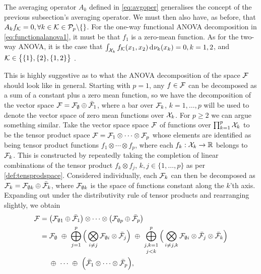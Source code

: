 The averaging operator $A_k$ defined in \cref{eq:avgoper} generalises the concept of the previous subsection's averaging operator.
We must then also have, as before, that $A_kf_{\mathcal K} = 0, \forall k \in {\mathcal K} \in {\mathcal P}_p\backslash\{\}$.
For the one-way functional ANOVA decomposition in \cref{eq:functionalanova1}, it must be that $f_1$ is a zero-mean function.
As for the two-way ANOVA, it is the case that $\int_{{\mathcal X}_k} f_{\mathcal K}(x_1,x_2) \operatorname{d}\hspace{0.5pt}\!\nu_k(x_k) = 0, k=1,2$, and ${\mathcal K} \in \big\{ \{1\}, \{2\}, \{1,2\} \big\}$ \citep{durrande2013anova}.

This is highly suggestive as to what the ANOVA decomposition of the space ${\mathcal F}$ should look like in general.
Starting with $p=1$, any $f \in {\mathcal F}$ can be decomposed as a sum of a constant plus a zero mean function, so we have the
decomposition of the vector space ${\mathcal F} = {\mathcal F}_\emptyset \oplus \bar{{\mathcal F}}_1$, where 
a bar over ${\mathcal F}_k$, $k=1,\dots,p$ will be used to denote the vector space of zero mean functions over ${\mathcal X}_k$.
For $p\geq 2$ we can argue something similar.
Take the vector space space ${\mathcal F}$ of functions over $\prod_{k=1}^p {\mathcal X}_k$ to be the tensor product space ${\mathcal F} = {\mathcal F}_1 \otimes \cdots \otimes {\mathcal F}_p$ whose elements are identified as being tensor product functions $f_1 \otimes\cdots\otimes f_p$, where each $f_k:{\mathcal X}_k\to\mathbb{R}$ belongs to ${\mathcal F}_k$.
This is constructed by repeatedly taking the completion of linear combinations of the tensor product $f_k \otimes f_j$, $k,j\in\{1,\dots,p\}$ as per \cref{def:tensprodspace}.
Considered individually, each ${\mathcal F}_k$ can then be decomposed as ${\mathcal F}_k = {\mathcal F}_{\emptyset k} \oplus \bar{{\mathcal F}}_k$, where ${\mathcal F}_{\emptyset k}$ is the space of functions constant along the $k$'th axis.
Expanding out under the distributivity rule of tensor products and rearranging slightly, we obtain
\begin{align}
  \cF ={}& \big( \cF_{\emptyset 1} \oplus \bar\cF_1 \big) \otimes \cdots \otimes 
  \big( \cF_{\emptyset p} \oplus \bar\cF_p \big) \nonumber \\
  ={}& \cF_{\emptyset}
  \ \oplus \
  \bigoplus_{j=1}^p 
  \Big( \bigotimes_{i\neq j}\cF_{\emptyset i} \otimes \bar\cF_j \Big) 
  \ \oplus \
  \mathop{\bigoplus_{j,k=1}^p}_{j<k} 
  \Big( \bigotimes_{i\neq j,k}\cF_{\emptyset i} \otimes \bar\cF_j \otimes \bar\cF_k \Big)
  \label{eq:funcanovaspace} \\
  & \oplus \ 
  \cdots 
  \ \oplus \ 
  \Big( \bar\cF_1 \otimes \cdots \otimes \bar\cF_p \Big), \nonumber
\end{align}
